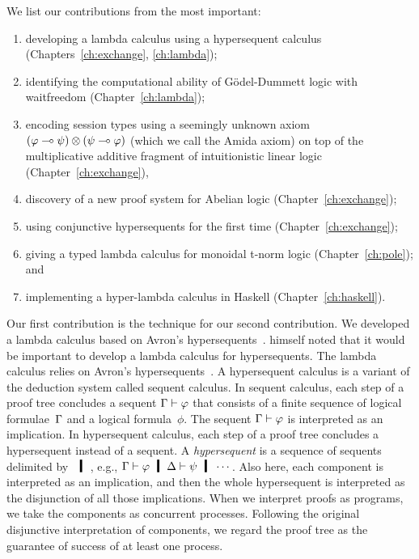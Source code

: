 We list our contributions from the most important:
\begin{enumerate}
 \item developing a lambda calculus using
       a hypersequent calculus (Chapters~\ref{ch:exchange}, \ref{ch:lambda});
 \item identifying the computational ability of
       G\"odel-Dummett logic with waitfreedom (Chapter~\ref{ch:lambda});
 \item encoding session types using a seemingly unknown axiom
       $(\varphi\multimap \psi)\otimes(\psi\multimap \varphi)$ (which we call the Amida axiom) on top
       of the multiplicative additive fragment of intuitionistic linear
       logic (Chapter~\ref{ch:exchange}),
 \item discovery of a new proof system for Abelian logic (Chapter~\ref{ch:exchange});
 \item using conjunctive hypersequents for the first time
       (Chapter~\ref{ch:exchange});
 \item giving a typed lambda calculus for monoidal t-norm logic
       (Chapter~\ref{ch:pole}); and
 \item implementing a hyper-lambda calculus in Haskell (Chapter~\ref{ch:haskell}).
\end{enumerate}

Our first contribution is the technique for our second contribution.
We developed a lambda calculus based on Avron's
hypersequents~\citep{avron91}.
\citet{avron91} himself noted that it would be important to develop a
lambda calculus for hypersequents.
The lambda calculus relies on Avron's hypersequents~\citep{avron91}.
A hypersequent calculus is a
variant of the deduction system called sequent calculus.  In sequent
calculus, each step of a proof tree concludes a sequent $\Gamma\vdash\varphi$ that
consists of a finite sequence of logical formulae~$\Gamma$ and a logical
formula~$\phi$.  The sequent $\Gamma\vdash\varphi$ is
interpreted as an implication.  In hypersequent calculus, each step of a
proof tree concludes a hypersequent instead of a sequent.  A
\textit{hypersequent}
is a sequence of sequents delimited by $\hmid$, e.g.,
$\G\vdash\phi\hmid \D\vdash\psi
\hmid \cdots$.  Also here, each component is interpreted as an
implication, and then the whole hypersequent is interpreted as the
disjunction of all those implications.
When we interpret proofs as programs, we take the components as
concurrent processes.  Following the original disjunctive
interpretation of components, we regard the proof tree as the guarantee of
success of at least one process.

